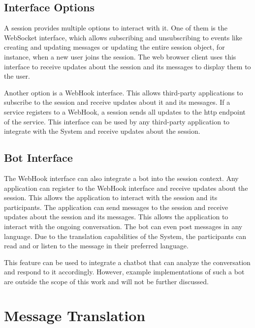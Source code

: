 \subsection{Interface Options}

A session provides multiple options to interact with it. One of them is the WebSocket interface, which allows 
subscribing and unsubscribing to events like creating and updating messages or updating the entire session object, 
for instance, when a new user joins the session. The web browser client uses this interface to receive updates about 
the session and its messages to display them to the user.

Another option is a WebHook interface. This allows third-party applications to subscribe to the session and receive 
updates about it and its messages. If a service registers to a WebHook, a session sends all updates to the \ac{http} 
endpoint of the service. This interface can be used by any third-party application to integrate with the System and 
receive updates about the session.

\subsection{Bot Interface}

The WebHook interface can also integrate a bot into the session context. Any application can register to the WebHook 
interface and receive updates about the session. This allows the application to interact with the session and its 
participants. The application can send messages to the session and receive updates about the session and its messages. 
This allows the application to interact with the ongoing conversation. The bot can even post messages in any language. 
Due to the translation capabilities of the System, the participants can read and or listen to the message in their 
preferred language.

This feature can be used to integrate a chatbot that can analyze the conversation and respond to it accordingly. 
However, example implementations of such a bot are outside the scope of this work and will not be further discussed.


\section{Message Translation}

